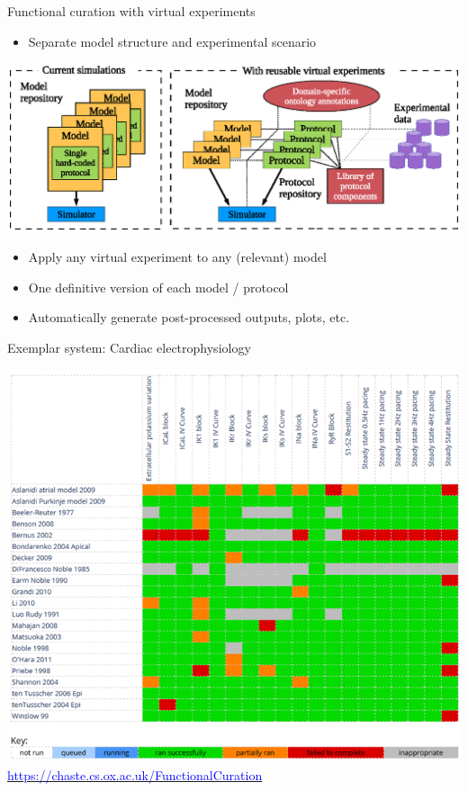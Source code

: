 \documentclass[t,xcolor={usenames,dvipsnames}]{beamer}
\newcommand{\myhref}[2]{\href{#1}{\textcolor{Blue}{#2}}}
\newcommand{\myurl}[1]{\myhref{#1}{#1}}
\newcommand{\subitem}[1]{\begin{itemize}[<.->]\item #1 \end{itemize}}
\begin{document}
\begin{frame}{Functional curation with virtual experiments}
\vspace{-.2cm}
\subitem{Separate \alert{model structure} and \alert{experimental scenario}}
\vspace{-.2cm}
\hspace{-1cm}\includegraphics[width=1.185\textwidth]{virtual_expts_schematic}
\vspace{-.31cm}
\begin{itemize}
\item Apply any \alert{virtual experiment} to any (relevant) model
\item One definitive version of each model / protocol
\item Automatically generate post-processed outputs, plots, etc.
\end{itemize}
\end{frame}


\begin{frame}{Exemplar system: Cardiac electrophysiology}
\begin{center}
\vspace{-.5cm}
\includegraphics[height=.8\textheight]{cardiac_fc_matrix}\\
\myurl{https://chaste.cs.ox.ac.uk/FunctionalCuration}
\end{center}
\end{frame}
\end{document}
